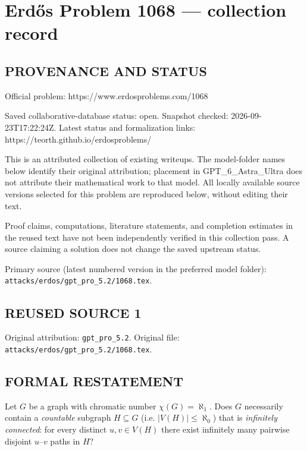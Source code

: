 \section*{Erd\H{o}s Problem 1068 --- collection record}

\subsection*{PROVENANCE AND STATUS}
Official problem: https://www.erdosproblems.com/1068

Saved collaborative-database status: open.
Snapshot checked: 2026-09-23T17:22:24Z.
Latest status and formalization links: https://teorth.github.io/erdosproblems/

This is an attributed collection of existing writeups. The model-folder names below identify their original attribution; placement in GPT\_6\_Astra\_Ultra does not attribute their mathematical work to that model. All locally available source versions selected for this problem are reproduced below, without editing their text.

Proof claims, computations, literature statements, and completion estimates in the reused text have not been independently verified in this collection pass. A source claiming a solution does not change the saved upstream status.

Primary source (latest numbered version in the preferred model folder): \texttt{attacks/erdos/gpt\_pro\_5.2/1068.tex}.

\subsection*{REUSED SOURCE 1}
Original attribution: \texttt{gpt\_pro\_5.2}.
Original file: \texttt{attacks/erdos/gpt\_pro\_5.2/1068.tex}.


\subsection*{FORMAL RESTATEMENT}
Let $G$ be a graph with chromatic number $\chi(G)=\aleph_1$.
Does $G$ necessarily contain a \emph{countable} subgraph $H\subseteq G$ (i.e. $|V(H)|\le\aleph_0$) that is \emph{infinitely connected}:
for every distinct $u,v\in V(H)$ there exist infinitely many pairwise disjoint $u$--$v$ paths in $H$?

